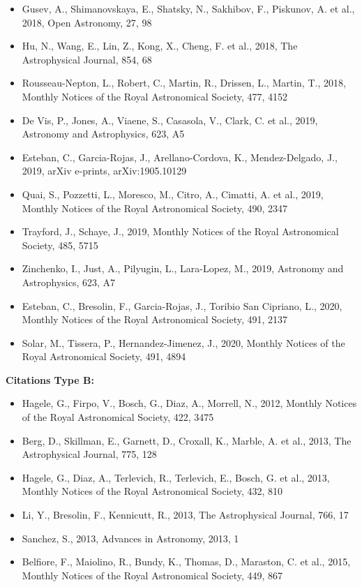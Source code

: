 \documentclass{letter}
\begin{document}
\begin{enumerate}
\begin{itemize}
\item Gusev, A., Shimanovskaya, E., Shatsky, N., Sakhibov, F., Piskunov, A. et al., 2018, Open Astronomy, 27, 98
\item Hu, N., Wang, E., Lin, Z., Kong, X., Cheng, F. et al., 2018, The Astrophysical Journal, 854, 68
\item Rousseau-Nepton, L., Robert, C., Martin, R., Drissen, L., Martin, T., 2018, Monthly Notices of the Royal Astronomical Society, 477, 4152
\item De Vis, P., Jones, A., Viaene, S., Casasola, V., Clark, C. et al., 2019, Astronomy and Astrophysics, 623, A5
\item Esteban, C., Garcia-Rojas, J., Arellano-Cordova, K., Mendez-Delgado, J., 2019, arXiv e-prints, arXiv:1905.10129
\item Quai, S., Pozzetti, L., Moresco, M., Citro, A., Cimatti, A. et al., 2019, Monthly Notices of the Royal Astronomical Society, 490, 2347
\item Trayford, J., Schaye, J., 2019, Monthly Notices of the Royal Astronomical Society, 485, 5715
\item Zinchenko, I., Just, A., Pilyugin, L., Lara-Lopez, M., 2019, Astronomy and Astrophysics, 623, A7
\item Esteban, C., Bresolin, F., Garcia-Rojas, J., Toribio San Cipriano, L., 2020, Monthly Notices of the Royal Astronomical Society, 491, 2137
\item Solar, M., Tissera, P., Hernandez-Jimenez, J., 2020, Monthly Notices of the Royal Astronomical Society, 491, 4894
\end{itemize}
{\bf Citations Type B:}
\begin{itemize}
\item Hagele, G., Firpo, V., Bosch, G., Diaz, A., Morrell, N., 2012, Monthly Notices of the Royal Astronomical Society, 422, 3475
\item Berg, D., Skillman, E., Garnett, D., Croxall, K., Marble, A. et al., 2013, The Astrophysical Journal, 775, 128
\item Hagele, G., Diaz, A., Terlevich, R., Terlevich, E., Bosch, G. et al., 2013, Monthly Notices of the Royal Astronomical Society, 432, 810
\item Li, Y., Bresolin, F., Kennicutt, R., 2013, The Astrophysical Journal, 766, 17
\item Sanchez, S., 2013, Advances in Astronomy, 2013, 1
\item Belfiore, F., Maiolino, R., Bundy, K., Thomas, D., Maraston, C. et al., 2015, Monthly Notices of the Royal Astronomical Society, 449, 867

\end{itemize}
\end{enumerate}
\end{document}
